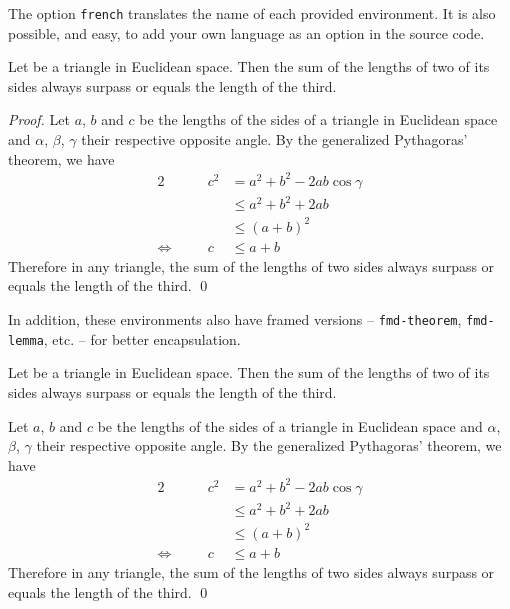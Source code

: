 \documentclass[a4paper, 12pt]{report}
\begin{document}
    \begin{note}
        The option \texttt{french} translates the name of each provided environment. It is also possible, and easy, to add your own language as an option in the source code.
    \end{note}

    \begin{theorem}
        Let be a triangle in Euclidean space. Then the sum of the lengths of two of its sides always surpass or equals the length of the third.
    \end{theorem}

    \begin{proof}
        Let $a$, $b$ and $c$ be the lengths of the sides of a triangle in Euclidean space and $\alpha$, $\beta$, $\gamma$ their respective opposite angle. By the generalized Pythagoras' theorem, we have
        \begin{alignat*}{2}
                                  &  & c^2 & = a^2 + b^2 - 2ab \cos\gamma \\
                                  &  &     & \leq a^2 + b^2 + 2ab         \\
                                  &  &     & \leq (a + b)^2               \\
            \Leftrightarrow \quad &  & c   & \leq a + b
        \end{alignat*}
        Therefore in any triangle, the sum of the lengths of two sides always surpass or equals the length of the third. \qed
    \end{proof}

    In addition, these environments also have framed versions -- \texttt{fmd-theorem}, \texttt{fmd-lemma}, etc. -- for better encapsulation.

    \begin{fmd-theorem}\label{thm:Triangle inequality}
        Let be a triangle in Euclidean space. Then the sum of the lengths of two of its sides always surpass or equals the length of the third.
    \end{fmd-theorem}

    \begin{fmd-proof}
        Let $a$, $b$ and $c$ be the lengths of the sides of a triangle in Euclidean space and $\alpha$, $\beta$, $\gamma$ their respective opposite angle. By the generalized Pythagoras' theorem, we have
        \begin{alignat*}{2}
                                  &  & c^2 & = a^2 + b^2 - 2ab \cos\gamma \\
                                  &  &     & \leq a^2 + b^2 + 2ab         \\
                                  &  &     & \leq (a + b)^2               \\
            \Leftrightarrow \quad &  & c   & \leq a + b
        \end{alignat*}
        Therefore in any triangle, the sum of the lengths of two sides always surpass or equals the length of the third. \qed
    \end{fmd-proof}
\end{document}

